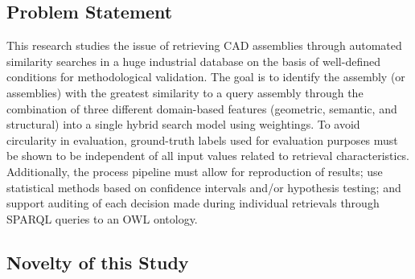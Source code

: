 \documentclass[preprint,12pt]{elsarticle}
\begin{document}
\subsection{Problem Statement}

This research studies the issue of retrieving CAD assemblies through automated similarity searches in a huge industrial database on the basis of well-defined conditions for methodological validation.
The goal is to identify the assembly (or assemblies) with the greatest similarity to a query assembly through the combination of three different domain-based features (geometric, semantic, and structural) into a single hybrid search model using weightings.
To avoid circularity in evaluation, ground-truth labels used for evaluation purposes must be shown to be independent of all input values related to retrieval characteristics.
Additionally, the process pipeline must allow for reproduction of results; use statistical methods based on confidence intervals and/or hypothesis testing; and support auditing of each decision made during individual retrievals through SPARQL queries to an OWL ontology.

\subsection{Novelty of this Study}
\end{document}
